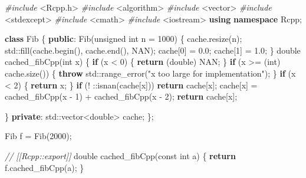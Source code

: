 \documentclass[]{article}
\newenvironment{Shaded}{\begin{snugshade}}{\end{snugshade}}
\newcommand{\KeywordTok}[1]{\textcolor[rgb]{0.13,0.29,0.53}{\textbf{#1}}}
\newcommand{\DataTypeTok}[1]{\textcolor[rgb]{0.13,0.29,0.53}{#1}}
\newcommand{\DecValTok}[1]{\textcolor[rgb]{0.00,0.00,0.81}{#1}}
\newcommand{\FloatTok}[1]{\textcolor[rgb]{0.00,0.00,0.81}{#1}}
\newcommand{\StringTok}[1]{\textcolor[rgb]{0.31,0.60,0.02}{#1}}
\newcommand{\ImportTok}[1]{#1}
\newcommand{\CommentTok}[1]{\textcolor[rgb]{0.56,0.35,0.01}{\textit{#1}}}
\newcommand{\ControlFlowTok}[1]{\textcolor[rgb]{0.13,0.29,0.53}{\textbf{#1}}}
\newcommand{\BuiltInTok}[1]{#1}
\newcommand{\PreprocessorTok}[1]{\textcolor[rgb]{0.56,0.35,0.01}{\textit{#1}}}
\newcommand{\AttributeTok}[1]{\textcolor[rgb]{0.77,0.63,0.00}{#1}}
\newcommand{\NormalTok}[1]{#1}
\begin{document}
\begin{Shaded}
\begin{Highlighting}[]
\PreprocessorTok{#include }\ImportTok{<Rcpp.h>}
\PreprocessorTok{#include }\ImportTok{<algorithm>}
\PreprocessorTok{#include }\ImportTok{<vector>}
\PreprocessorTok{#include }\ImportTok{<stdexcept>}
\PreprocessorTok{#include }\ImportTok{<cmath>}
\PreprocessorTok{#include }\ImportTok{<iostream>}
\KeywordTok{using} \KeywordTok{namespace}\NormalTok{ Rcpp;}

\KeywordTok{class}\NormalTok{ Fib \{}
  \KeywordTok{public}\NormalTok{:}
\NormalTok{    Fib(}\DataTypeTok{unsigned} \DataTypeTok{int}\NormalTok{ n = }\DecValTok{1000}\NormalTok{) \{}
\NormalTok{      cache.resize(n);}
      \BuiltInTok{std::}\NormalTok{fill(cache.begin(), cache.end(), NAN);}
\NormalTok{      cache[}\DecValTok{0}\NormalTok{] = }\FloatTok{0.0}\NormalTok{;}
\NormalTok{      cache[}\DecValTok{1}\NormalTok{] = }\FloatTok{1.0}\NormalTok{;}
\NormalTok{    \}}
    \DataTypeTok{double}\NormalTok{ cached_fibCpp(}\DataTypeTok{int}\NormalTok{ x) \{}
      \ControlFlowTok{if}\NormalTok{ (x < }\DecValTok{0}\NormalTok{) \{}
        \ControlFlowTok{return}\NormalTok{ (}\DataTypeTok{double}\NormalTok{) NAN;}
\NormalTok{      \}}
      \ControlFlowTok{if}\NormalTok{ (x >= (}\DataTypeTok{int}\NormalTok{) cache.size()) \{}
        \ControlFlowTok{throw} \BuiltInTok{std::}\NormalTok{range_error(}\StringTok{"x too large for implementation"}\NormalTok{);}
\NormalTok{      \}}
      \ControlFlowTok{if}\NormalTok{ (x < }\DecValTok{2}\NormalTok{) \{}
        \ControlFlowTok{return}\NormalTok{ x;}
\NormalTok{      \}}
      \ControlFlowTok{if}\NormalTok{ (! ::isnan(cache[x])) }\ControlFlowTok{return}\NormalTok{ cache[x];}
\NormalTok{      cache[x] = cached_fibCpp(x - }\DecValTok{1}\NormalTok{) + cached_fibCpp(x - }\DecValTok{2}\NormalTok{);}
      \ControlFlowTok{return}\NormalTok{ cache[x];}
      
\NormalTok{    \}}
  \KeywordTok{private}\NormalTok{:}
    \BuiltInTok{std::}\NormalTok{vector<}\DataTypeTok{double}\NormalTok{> cache;}
\NormalTok{\};}

\NormalTok{Fib f = Fib(}\DecValTok{2000}\NormalTok{);}

\CommentTok{// [[Rcpp::export]]}
\DataTypeTok{double}\NormalTok{ cached_fibCpp(}\AttributeTok{const} \DataTypeTok{int}\NormalTok{ a) \{}
  \ControlFlowTok{return}\NormalTok{ f.cached_fibCpp(a);}
\NormalTok{\}}
\end{Highlighting}
\end{Shaded}
\end{document}
